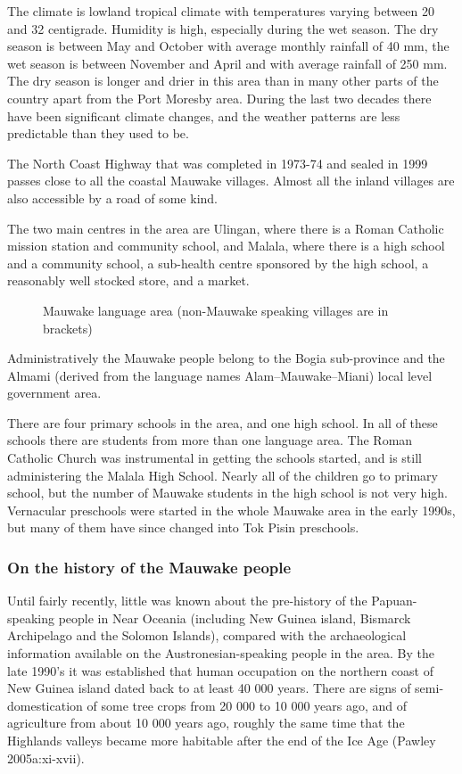 The climate is lowland tropical climate with temperatures varying between 20{\textdegree} and 32{\textdegree} centigrade. Humidity is high, especially during the wet season.  The dry season is between May and October with average monthly rainfall of 40 mm, the wet season is between November and April and with average rainfall of 250 mm. The dry season is longer and drier in this area than in many other parts of the country apart from the Port Moresby area. During the last two decades there have been significant climate changes, and the weather patterns are less predictable than they used to be.

The North Coast Highway that was completed in 1973-74 and sealed in 1999 passes close to all the coastal Mauwake villages.  Almost all the inland villages are also accessible by a road of some kind. 

The two main centres in the area are Ulingan, where there is a Roman Catholic mission station and community school, and Malala, where there is a high school and a community school, a sub-health centre sponsored by the high school, a reasonably well stocked store, and a market.


\begin{figure}
\caption{Mauwake language area (non-Mauwake speaking villages are in brackets)}
\label{fig:map:1}
\end{figure}

Administratively the Mauwake people belong to the Bogia sub-province and the Almami (derived from the language names Alam--Mauwake--Miani) local level government area. 

There are four primary schools in the area, and one high school.  In all of these schools there are students from more than one language area. The Roman Catholic Church was instrumental in getting the schools started, and is still administering the Malala High School.  Nearly all of the children go to primary school, but the number of Mauwake students in the high school is not very high. Vernacular preschools were started in the whole Mauwake area in the early 1990s, but many of them have since changed into Tok Pisin preschools.

\subsubsection{On the history of the Mauwake people}
\hypertarget{RefHeading18461935131865}{}Until fairly recently, little was known about the pre-history of the Papuan-speaking people in Near Oceania (including New Guinea island, Bismarck Archipelago and the Solomon Islands), compared with the archaeological information available on the Austronesian-speaking people in the area. By the late 1990's it was established that human occupation on the northern coast of New Guinea island dated back to at least 40 000 years. There are signs of semi-domestication of some tree crops from 20 000 to 10 000 years ago, and of agriculture from about 10 000 years ago, roughly the same time that the Highlands valleys became more habitable after the end of the Ice Age (Pawley 2005a:xi-xvii). 

